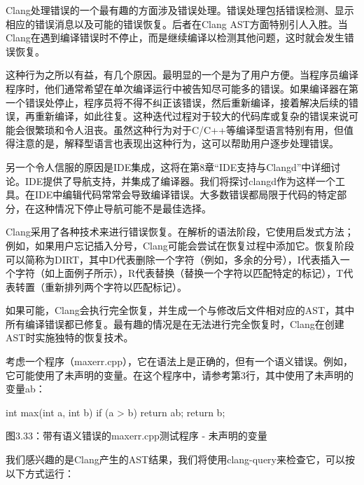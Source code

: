 Clang处理错误的一个最有趣的方面涉及错误处理。错误处理包括错误检测、显示相应的错误消息以及可能的错误恢复。后者在Clang AST方面特别引人入胜。当Clang在遇到编译错误时不停止，而是继续编译以检测其他问题，这时就会发生错误恢复。

这种行为之所以有益，有几个原因。最明显的一个是为了用户方便。当程序员编译程序时，他们通常希望在单次编译运行中被告知尽可能多的错误。如果编译器在第一个错误处停止，程序员将不得不纠正该错误，然后重新编译，接着解决后续的错误，再重新编译，如此往复。这种迭代过程对于较大的代码库或复杂的错误来说可能会很繁琐和令人沮丧。虽然这种行为对于C/C++等编译型语言特别有用，但值得注意的是，解释型语言也表现出这种行为，这可以帮助用户逐步处理错误。

另一个令人信服的原因是IDE集成，这将在第8章“IDE支持与Clangd”中详细讨论。IDE提供了导航支持，并集成了编译器。我们将探讨clangd作为这样一个工具。在IDE中编辑代码常常会导致编译错误。大多数错误都局限于代码的特定部分，在这种情况下停止导航可能不是最佳选择。

Clang采用了各种技术来进行错误恢复。在解析的语法阶段，它使用启发式方法；例如，如果用户忘记插入分号，Clang可能会尝试在恢复过程中添加它。恢复阶段可以简称为DIRT，其中D代表删除一个字符（例如，多余的分号），I代表插入一个字符（如上面例子所示），R代表替换（替换一个字符以匹配特定的标记），T代表转置（重新排列两个字符以匹配标记）。

如果可能，Clang会执行完全恢复，并生成一个与修改后文件相对应的AST，其中所有编译错误都已修复。最有趣的情况是在无法进行完全恢复时，Clang在创建AST时实施独特的恢复技术。

考虑一个程序（maxerr.cpp），它在语法上是正确的，但有一个语义错误。例如，它可能使用了未声明的变量。在这个程序中，请参考第3行，其中使用了未声明的变量ab：

\begin{cpp}
int max(int a, int b) {
  if (a > b) {
    return ab;
  }
  return b;
}
\end{cpp}

\begin{center}
图3.33：带有语义错误的maxerr.cpp测试程序 - 未声明的变量
\end{center}

我们感兴趣的是Clang产生的AST结果，我们将使用clang-query来检查它，可以按以下方式运行：


